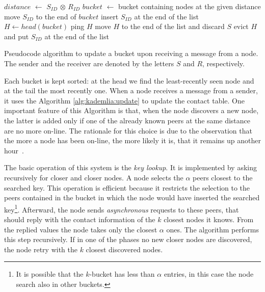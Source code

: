 \begin{algorithm}[t]
    \begin{algorithmic}
        \State $distance$ $\gets$ $S_{ID}$ $\otimes$ $R_{ID}$
        \State $bucket$ $\gets$ bucket containing nodes at the given distance
        \State move $S_{ID}$ to the end of $bucket$
        \Else
        \State insert $S_{ID}$ at the end of the list
        \Else
        \State $H \gets head(bucket)$
        \State ping $H$
        \State move $H$ to the end of the list and discard $S$
        \Else
        \State evict $H$ and put $S_{ID}$ at the end of the list
        \EndIf
        \EndIf
        \EndIf
    \end{algorithmic}
    \caption{Pseudocode algorithm to update a bucket upon receiving a message
    from a node. The sender and the receiver are denoted by the letters $S$ and
    $R$, respectively.}
    \label{alg:kademlia:update}
\end{algorithm}

Each bucket is kept sorted: at the head we find the least-recently seen node
and at the tail the most recently one.
When a node receives a message from a sender, it uses
the Algorithm \autoref{alg:kademlia:update} to update the contact table.
One important feature of this Algorithm is that, when the node discovers
a new node, the latter is added only if one of the already known peers at the
same distance are no more on-line. The rationale for this choice is due
to the observation that the more a node has been on-line, the more likely it is,
that it remains up another hour~\cite{bib:kademlia}.

The basic operation of this system is the \emph{key lookup}.
It is implemented by asking recursively for closer and closer nodes.
A node selects the $\alpha$ peers closest to the searched key.
This operation is efficient because
it restricts the selection to the peers contained in the bucket in which the
node would have inserted the searched key\footnote{It is possible that the
    $k$-bucket
has less than $\alpha$ entries, in this case the node search also in other
buckets.}.
Afterward, the node sends \emph{asynchronous} requests to these peers, that
should reply with the contact information of the $k$ closest nodes it knows.
From the replied values the node takes only the closest $\alpha$ ones.
The algorithm performs this step recursively.
If in one of the phases no new closer nodes are discovered, the node retry with
the $k$ closest discovered nodes.

